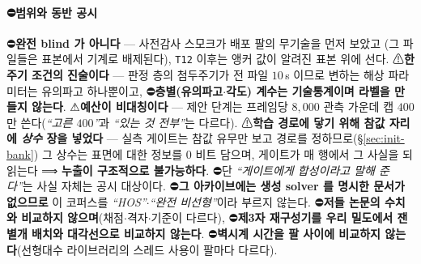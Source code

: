 \documentclass[11pt]{report}
\numberwithin{equation}{chapter}
\numberwithin{figure}{chapter}
\numberwithin{table}{chapter}
\begin{document}
\paragraph{⛔범위와 동반 공시}
⛔\textbf{완전 blind 가 아니다} --- 사전감사 스모크가 배포 팔의 무기술을 먼저 보았고
(그 파일들은 표본에서 기계로 배제된다), \texttt{T12} 이후는 앵커 값이 알려진 표본 위에 선다.
⚠\textbf{한 주기 조건의 진술이다} --- 판정 층의 첨두주기가 전 파일 $10$\,s 이므로
변하는 해상 파라미터는 유의파고 하나뿐이고, ⛔\textbf{층별(유의파고$\cdot$각도) 계수는
기술통계이며 라벨을 만들지 않는다}.
⚠\textbf{예산이 비대칭이다} --- 제안 단계는 프레임당 $8{,}000$ 관측 가운데 캡
$400$ 만 쓴다(\emph{``고른 $400$''}과 \emph{``있는 것 전부''}는 다르다).
⚠\textbf{학습 경로에 닿기 위해 참값 자리에 \emph{상수} 장을 넣었다} --- 실측 게이트는
참값 유무만 보고 경로를 정하므로(\S\ref{sec:init-bank}) 그 상수는 표면에 대한 정보를
$0$ 비트 담으며, 게이트가 매 행에서 그 사실을 되읽는다 ⟹ \textbf{누출이 구조적으로
불가능하다}. ⛔단 \emph{``게이트에게 합성이라고 말해 준다''}는 사실 자체는 공시 대상이다.
⛔\textbf{그 아카이브에는 생성 solver 를 명시한 문서가 없으므로} 이 코퍼스를
\emph{``HOS''}$\cdot$\emph{``완전 비선형''}이라 부르지 않는다.
⛔\textbf{저들 논문의 수치와 비교하지 않으며}(채점$\cdot$격자$\cdot$기준이 다르다),
⛔\textbf{제3자 재구성기를 우리 밀도에서 잰 별개 배치와 대각선으로 비교하지 않는다}.
⛔\textbf{벽시계 시간을 팔 사이에 비교하지 않는다}(선형대수 라이브러리의 스레드 사용이
팔마다 다르다).

\end{document}
